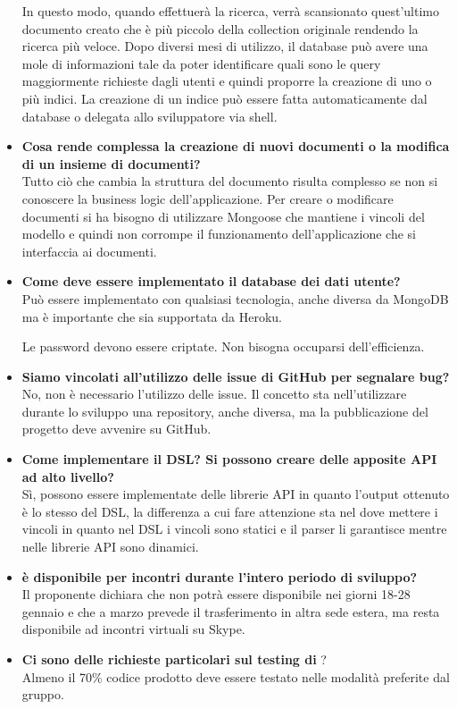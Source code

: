 \begin{itemize}
In questo modo, quando effettuerà la ricerca, verrà scansionato quest'ultimo documento creato che è più piccolo della collection originale rendendo la ricerca più veloce.	 
Dopo diversi mesi di utilizzo, il database può avere una mole di informazioni tale da poter identificare quali sono le query
maggiormente richieste dagli utenti e quindi proporre la creazione di uno o più indici.
La creazione di un indice può essere fatta automaticamente dal database o delegata allo sviluppatore via shell.
		
		\item
		{\bfseries Cosa rende complessa la creazione di nuovi documenti o la modifica di un insieme di documenti?} \\
		Tutto ciò che cambia la struttura del documento risulta complesso se non si conoscere la business logic dell'applicazione.
		Per creare o modificare documenti si ha bisogno di utilizzare Mongoose che mantiene i vincoli del modello e quindi non corrompe il funzionamento dell'applicazione che si interfaccia ai documenti.
		
		\item
		{\bfseries Come deve essere implementato il database dei dati utente?} \\
		Può essere implementato con qualsiasi tecnologia, anche diversa da MongoDB ma è importante che sia supportata da Heroku.
		
		Le password devono essere criptate.
		Non bisogna occuparsi dell'efficienza.
		
		\item
		{\bfseries Siamo vincolati all'utilizzo delle issue di GitHub per segnalare bug?} \\
		No, non è necessario l'utilizzo delle issue. 
		Il concetto sta nell'utilizzare durante lo sviluppo una repository, anche diversa, ma la pubblicazione del
		progetto deve avvenire su GitHub.
		
		\item
		{\bfseries Come implementare il DSL? Si possono creare delle apposite API ad alto livello?} \\
		Sì, possono essere implementate delle librerie API in quanto l'output ottenuto è lo stesso del DSL, la differenza a cui 	fare attenzione sta nel dove mettere i vincoli in quanto nel DSL i vincoli sono statici e il parser li garantisce mentre nelle librerie API sono dinamici.
		
		\item
		{\bfseries \Proponente{} è disponibile per incontri durante l'intero periodo di sviluppo?} \\
		Il proponente dichiara che non potrà essere disponibile nei giorni 18-28 gennaio e che a marzo prevede il trasferimento in
		altra sede estera, ma resta disponibile ad incontri virtuali su Skype.
				
		\item
		{\bfseries Ci sono delle richieste particolari sul testing di \ProjectName{}}? \\
		Almeno il 70\% codice prodotto deve essere testato nelle modalità preferite dal gruppo.
		
	\end{itemize}

